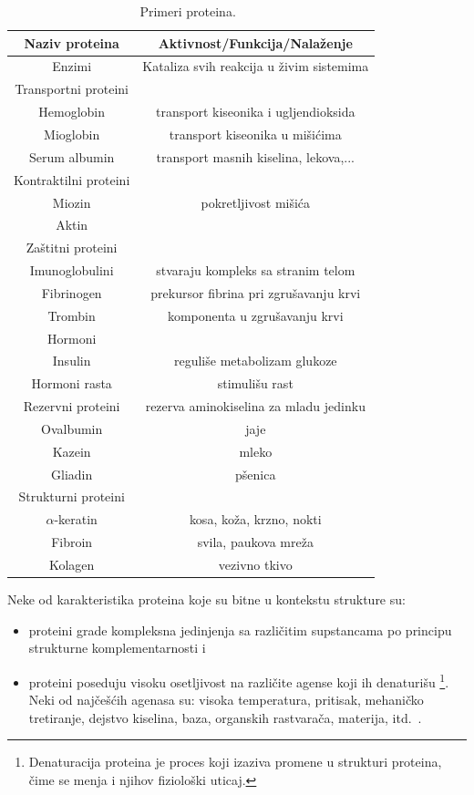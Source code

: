 \begin{table}[H]
\centering
 \begin{tabular}{|c | @{\extracolsep{\fill}}c|} 
 \hline
Naziv proteina & Aktivnost/Funkcija/Nalaženje\\ [0.5ex] 
 \hline\hline
 Enzimi & Kataliza svih reakcija u živim sistemima \\ 
 \hline
 Transportni proteini & \\
 Hemoglobin & transport kiseonika i ugljendioksida  \\ 
 Mioglobin & transport kiseonika u mišićima  \\ 
 Serum albumin & transport masnih kiselina, lekova,...  \\ 
 \hline
 Kontraktilni proteini & \\
 Miozin & pokretljivost mišića  \\ 
 Aktin &   \\ 
 \hline
 Zaštitni proteini & \\
 Imunoglobulini & stvaraju kompleks sa stranim telom  \\ 
 Fibrinogen & prekursor fibrina pri zgrušavanju krvi \\ 
 Trombin & komponenta u zgrušavanju krvi  \\ 
 \hline
  Hormoni & \\
 Insulin & reguliše metabolizam glukoze  \\ 
 Hormoni rasta &  stimulišu rast \\ 
 \hline
  Rezervni proteini & rezerva aminokiselina za mladu jedinku\\
 Ovalbumin & jaje  \\ 
 Kazein & mleko \\ 
 Gliadin & pšenica  \\ 
 \hline
  Strukturni proteini &\\
 $\alpha$-keratin & kosa, koža, krzno, nokti  \\ 
 Fibroin & svila, paukova mreža\\ 
 Kolagen & vezivno tkivo  \\ 
 \hline
\end{tabular}
\caption{Primeri proteina.~\cite{Principi}}
\label{table:4}
\end{table}

Neke od karakteristika proteina koje su bitne u kontekstu strukture su:
\begin{itemize}
\item proteini grade kompleksna jedinjenja sa različitim supstancama po principu strukturne komplementarnosti i  
\item proteini poseduju visoku osetljivost na različite agense koji ih denaturišu \footnote{Denaturacija proteina je proces koji izaziva promene u strukturi proteina, čime se menja i njihov fiziološki uticaj.}. Neki od najčešćih agenasa su: visoka temperatura, pritisak, mehaničko tretiranje, dejstvo kiselina, baza, organskih rastvarača, materija, itd.~\cite{spasic,JKd}.
\end{itemize}
 
